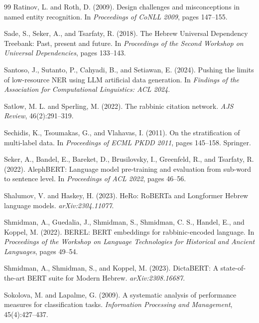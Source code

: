 \documentclass[11pt,a4paper]{article}
\begin{document}
\begin{thebibliography}{99}
Ratinov, L. and Roth, D. (2009).
Design challenges and misconceptions in named entity recognition.
In \emph{Proceedings of CoNLL 2009}, pages 147--155.

Sade, S., Seker, A., and Tsarfaty, R. (2018).
The Hebrew Universal Dependency Treebank: Past, present and future.
In \emph{Proceedings of the Second Workshop on Universal Dependencies}, pages 133--143.

Santoso, J., Sutanto, P., Cahyadi, B., and Setiawan, E. (2024).
Pushing the limits of low-resource NER using LLM artificial data generation.
In \emph{Findings of the Association for Computational Linguistics: ACL 2024}.

Satlow, M. L. and Sperling, M. (2022).
The rabbinic citation network.
\emph{AJS Review}, 46(2):291--319.

Sechidis, K., Tsoumakas, G., and Vlahavas, I. (2011).
On the stratification of multi-label data.
In \emph{Proceedings of ECML PKDD 2011}, pages 145--158. Springer.

Seker, A., Bandel, E., Bareket, D., Brusilovsky, I., Greenfeld, R., and Tsarfaty, R. (2022).
AlephBERT: Language model pre-training and evaluation from sub-word to sentence level.
In \emph{Proceedings of ACL 2022}, pages 46--56.

Shalumov, V. and Haskey, H. (2023).
HeRo: RoBERTa and Longformer Hebrew language models.
\emph{arXiv:2304.11077}.

Shmidman, A., Guedalia, J., Shmidman, S., Shmidman, C. S., Handel, E., and Koppel, M. (2022).
BEREL: BERT embeddings for rabbinic-encoded language.
In \emph{Proceedings of the Workshop on Language Technologies for Historical and Ancient Languages}, pages 49--54.

Shmidman, A., Shmidman, S., and Koppel, M. (2023).
DictaBERT: A state-of-the-art BERT suite for Modern Hebrew.
\emph{arXiv:2308.16687}.

Sokolova, M. and Lapalme, G. (2009).
A systematic analysis of performance measures for classification tasks.
\emph{Information Processing and Management}, 45(4):427--437.


\end{thebibliography}
\end{document}
